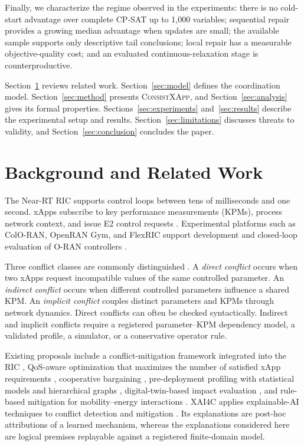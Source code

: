 \documentclass[pdflatex,sn-mathphys-num,iicol,oneside]{sn-jnl}
\newcommand{\method}{\textsc{ConsistXApp}\xspace}
\newcommand{\cpsat}{\textsc{CP-SAT}\xspace}
\begin{document}
Finally, we characterize the regime observed in the experiments:
there is no cold-start advantage over complete \cpsat up to 1{,}000
variables; sequential repair provides a growing median advantage when
updates are small; the available sample supports only descriptive
tail conclusions; local repair has a measurable objective-quality
cost; and an evaluated continuous-relaxation stage is
counterproductive.

Section~\ref{sec:background} reviews related work.
Section~\ref{sec:model} defines the coordination model.
Section~\ref{sec:method} presents \method, and
Section~\ref{sec:analysis} gives its formal properties.
Sections~\ref{sec:experiments} and~\ref{sec:results} describe the
experimental setup and results.
Section~\ref{sec:limitations} discusses threats to validity, and
Section~\ref{sec:conclusion} concludes the paper.

\section{Background and Related Work}
\label{sec:background}

The Near-RT RIC supports control loops between tens of milliseconds
and one second. xApps subscribe to key performance measurements
(KPMs), process network context, and issue E2 control requests
\cite{polese2023oran}. Experimental platforms such as ColO-RAN,
OpenRAN Gym, and FlexRIC support development and closed-loop
evaluation of O-RAN controllers
\cite{polese2022coloran,bonati2023openrangym,schmidt2021flexric}.

Three conflict classes are commonly distinguished
\cite{adamczyk2023conflict}. A \emph{direct conflict} occurs when two
xApps request incompatible values of the same controlled parameter.
An \emph{indirect conflict} occurs when different controlled
parameters influence a shared KPM. An \emph{implicit conflict}
couples distinct parameters and KPMs through network dynamics. Direct
conflicts can often be checked syntactically. Indirect and implicit
conflicts require a registered parameter--KPM dependency model, a
validated profile, a simulator, or a conservative operator rule.

Existing proposals include a conflict-mitigation framework integrated
into the RIC \cite{adamczyk2023conflict}, QoS-aware optimization that
maximizes the number of satisfied xApp requirements
\cite{wadud2024qacm,annals2024}, cooperative bargaining
\cite{wadud2023game}, pre-deployment profiling with statistical models
and hierarchical graphs \cite{prever2025pacifista},
digital-twin-based impact evaluation \cite{giannopoulos2025comix}, and
rule-based mitigation for mobility--energy interactions
\cite{wadud2025mobility}. XAI4C applies explainable-AI techniques to
conflict detection and mitigation \cite{varshney2025xai4c}. Its
explanations are post-hoc attributions of a learned mechanism,
whereas the explanations considered here are logical premises
replayable against a registered finite-domain model.
\end{document}
